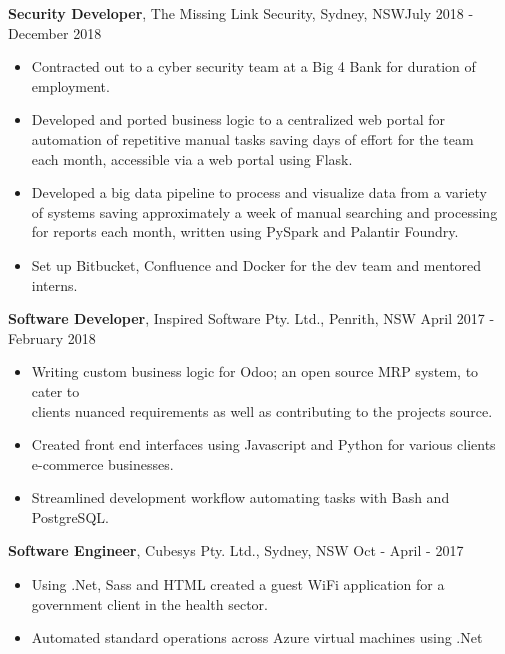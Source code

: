 \documentclass[margin]{res}
\begin{document}
\begin{resume}
{\bf Security Developer}, 
	The Missing Link Security, Sydney, NSW\hfill July 2018 - December 2018
\begin{itemize} \itemsep 2pt  %
\item Contracted out to a cyber security team at a Big 4 Bank for duration of \\
	employment.

\item Developed and ported business logic to a centralized web portal for \\
	automation of repetitive manual tasks saving days of effort for the team \\ 
		each month, accessible via a web portal using Flask. 

\item Developed a big data pipeline to process and visualize data from a variety \\
	of systems saving approximately a week of manual searching and processing \\
		for reports each month, written using PySpark and Palantir Foundry.

\item Set up Bitbucket, Confluence and Docker for the dev team and mentored interns. 

\end{itemize}

{\bf Software Developer}, 
	Inspired Software Pty. Ltd., Penrith, NSW \hfill April 2017 - February 2018
\begin{itemize} \itemsep 2pt  %
\item Writing custom business logic for Odoo; an open source MRP system, to cater to \\
	clients nuanced requirements as well as contributing to the projects source.

\item  Created front end interfaces using Javascript and Python for various clients \\
	e-commerce businesses.

\item Streamlined development workflow automating tasks with Bash and PostgreSQL.
\end{itemize}

 {\bf Software Engineer}, 
	Cubesys Pty. Ltd., Sydney, NSW \hfill Oct - April - 2017
 \begin{itemize} \itemsep 2pt  %
 \item Using .Net, Sass and HTML created a guest WiFi application for a \\
	 government client in the health sector.
 \item Automated standard operations across Azure virtual machines using .Net
 \end{itemize}


\end{resume}
\end{document}
